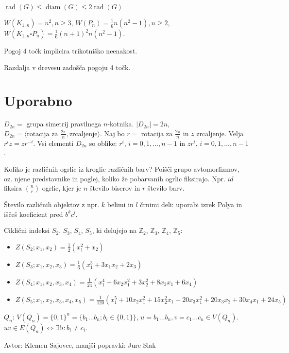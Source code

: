\documentclass[8pt,a4paper]{amsart}
\theoremstyle{definition} %
\theoremstyle{plain} %
\newcommand{\Z}{\mathbb Z}
\begin{document}
$\operatorname{rad}(G) \leq \operatorname{diam}(G) \leq 2\operatorname{rad}(G)$

$W(K_{1,n}) = n^2, n\geq 3$, $W(P_n) = \frac{1}{6}n(n^2-1), n\geq 2$, $W(K_{1,n}
\square P_n) = \frac{1}{6}(n+1)^2n(n^2-1)$.

Pogoj 4 točk implicira trikotniško neenakost.

Razdalja v drevesu zadošča pogoju 4 točk.

\vspace{-2ex}
\section{Uporabno}

$D_{2n} = $ grupa simetrij pravilnega $n$-kotnika. $|D_{2n}| = 2n$, $D_{2n} =
\langle \text{rotacija za }\frac{2\pi}{n},\text{zrcaljenje}\rangle$. Naj bo
$r=\text{ rotacija za }\frac{2\pi}{n}$ in $z$ zrcaljenje. Velja $r^iz =
zr^{-i}$. Vsi elementi $D_{2n}$ so oblike: $r^i$, $i=0,1,\ldots ,n-1$ in $zr^i$,
$i=0,1,\ldots ,n-1$.

Koliko je različnih ogrlic iz kroglic različnih barv? Poišči grupo
avtomorfizmov, oz. njene predstavnike in poglej, koliko že pobarvanih ogrlic
fiksirajo. Npr. $id$ fiksira $\binom{n}{r}$ ogrlic, kjer je $n$ število biserov
in $r$ število barv.

Število različnih objektov z npr. $k$ belimi in $l$ črnimi deli: uporabi izrek
Polya in iščeš koeficient pred $b^kc^l$.

Ciklični indeksi $S_2$, $S_3$, $S_4$, $S_5$, ki delujejo na $\Z_2$, $\Z_3$, $\Z_4$, $\Z_5$:
\begin{itemize}
 \item $Z(S_2;x_1,x_2)=\frac{1}{2}(x_1^2+x_2)$
 \item $Z(S_3;x_1,x_2,x_3)=\frac{1}{6}(x_1^3+3x_1x_2+2x_3)$
 \item $Z(S_4;x_1,x_2,x_3,x_4)=\frac{1}{24}(x_1^4+6x_2x_1^2+3x_2^2+8x_3x_1+6x_4)$
 \item $Z(S_5;x_1,x_2,x_3,x_4,x_5)=\frac{1}{120}(x_1^5+10x_2x_1^2+15x_2^2x_1+20x_3x_1^2+20x_3x_2+30x_4x_1+24x_5)$
\end{itemize}

$Q_n$: $V(Q_n) = \{0,1 \}^n = \{ b_1\ldots b_n; b_i \in \{0,1\} \}$,
$u=b_1\ldots b_n, v = c_1\ldots c_n \in V(Q_n)$. $uv \in E(Q_n)
\Longleftrightarrow \exists! i: b_i \neq c_i$.

\hfill Avtor: Klemen Sajovec, manjši popravki: Jure Slak
\end{document}
